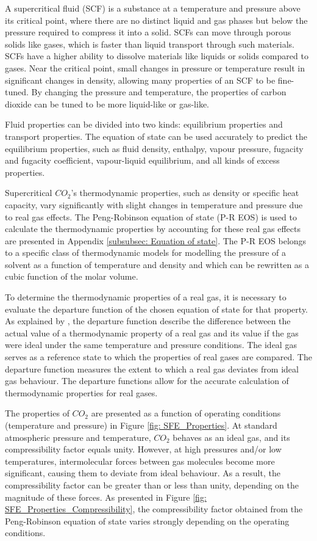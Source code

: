 \documentclass[../Article_Sensitivity_Analsysis.tex]{subfiles}
\begin{document}
	
	A supercritical fluid (SCF) is a substance at a temperature and pressure above its critical point, where there are no distinct liquid and gas phases but below the pressure required to compress it into a solid. SCFs can move through porous solids like gases, which is faster than liquid transport through such materials. SCFs have a higher ability to dissolve materials like liquids or solids compared to gases. Near the critical point, small changes in pressure or temperature result in significant changes in density, allowing many properties of an SCF to be fine-tuned. By changing the pressure and temperature, the properties of carbon dioxide can be tuned to be more liquid-like or gas-like.

	Fluid properties can be divided into two kinds: equilibrium properties and transport properties. The equation of state can be used accurately to predict the equilibrium properties, such as fluid density, enthalpy, vapour pressure, fugacity and fugacity coefficient, vapour-liquid equilibrium, and all kinds of excess properties.
	
	Supercritical $CO_2$'s thermodynamic properties, such as density or specific heat capacity, vary significantly with slight changes in temperature and pressure due to real gas effects. The Peng-Robinson equation of state (P-R EOS) is used to calculate the thermodynamic properties by accounting for these real gas effects are presented in Appendix \ref{subsubsec: Equation of state}. The P-R EOS belongs to a specific class of thermodynamic models for modelling the pressure of a solvent as a function of temperature and density and which can be rewritten as a cubic function of the molar volume.
	
	To determine the thermodynamic properties of a real gas, it is necessary to evaluate the departure function of the chosen equation of state for that property. As explained by \citet{Elliott2011}, the departure function describe the difference between the actual value of a thermodynamic property of a real gas and its value if the gas were ideal under the same temperature and pressure conditions. The ideal gas serves as a reference state to which the properties of real gases are compared. The departure function measures the extent to which a real gas deviates from ideal gas behaviour. The departure functions allow for the accurate calculation of thermodynamic properties for real gases. %
	
	The properties of $CO_2$ are presented as a function of operating conditions (temperature and pressure) in Figure \ref{fig: SFE_Properties}. At standard atmospheric pressure and temperature, $CO_2$  behaves as an ideal gas, and its compressibility factor equals unity. However, at high pressures and/or low temperatures, intermolecular forces between gas molecules become more significant, causing them to deviate from ideal behaviour. As a result, the compressibility factor can be greater than or less than unity, depending on the magnitude of these forces. As presented in Figure \ref{fig: SFE_Properties_Compressibility}, the compressibility factor obtained from the Peng-Robinson equation of state varies strongly depending on the operating conditions. 
	
\end{document}
